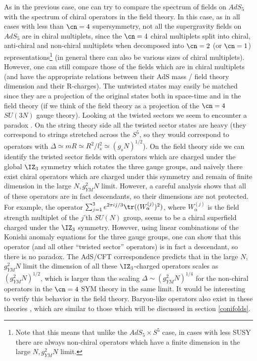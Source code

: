 As in the previous case, one can try to compare the spectrum of fields
on $AdS_5$ with the spectrum of chiral operators in the field
theory. In this case, as in all cases with less than $\cn=4$
supersymmetry, not all the supergravity fields on $AdS_5$ are in
chiral multiplets, since the $\cn=4$ chiral multiplets split into
chiral, anti-chiral and non-chiral multiplets when decomposed into
$\cn=2$ (or $\cn=1$) representations\footnote{Note that this means
that unlike the $AdS_5\times S^5$ case, in cases with less SUSY there
are always non-chiral operators which have a finite dimension in the
large $N, g_{YM}^2 N$ limit.} (in general there can also be various sizes of
chiral multiplets). However, one can still compare those of
the fields which are in chiral multiplets (and have the appropriate
relations between their AdS mass / field theory dimension and their
R-charges). The untwisted states may easily be matched since they are
a projection of the original states both in space-time and in the
field theory (if we think of the field theory as a projection of the
$\cn=4$ $SU(3N)$ gauge theory). Looking at the twisted sectors we seem
to encounter a paradox \cite{Morrison:1998cs}. On the string theory
side all the twisted sector states are heavy (they correspond to
strings stretched across the $S^5$, so they would correspond to
operators with $\Delta
\simeq mR \simeq R^2 / l_s^2 \simeq (g_s N)^{1/2}$). On the field
theory side we can identify the twisted sector fields with operators
which are charged under the global $\IZ_3$ symmetry which rotates the
three gauge groups, and naively there exist chiral operators which are
charged under this symmetry and remain of finite dimension in the
large $N,g_{YM}^2 N$ limit. However, a careful analysis shows that all
of these operators are in fact descendants, so their dimensions are
not protected. For example, the operator $\sum_{j=1}^3 e^{2\pi ij/3}
\tr((W_{\alpha}^{(j)})^2)$, where $W_{\alpha}^{(j)}$ is the field
strength multiplet of the $j$'th $SU(N)$ group, seems to be a chiral
superfield charged under the $\IZ_3$ symmetry. However, using linear
combinations of the Konishi anomaly equations
\cite{Konishi:1984hf,Konishi:1985tu} for the three gauge groups, one
can show that this operator (and all other ``twisted sector''
operators) is in fact a descendant, so there is no paradox. The
AdS/CFT correspondence predicts that in the large $N$, $g_{YM}^2 N$
limit the dimension of all these $\IZ_3$-charged operators scales as
$(g_{YM}^2 N)^{1/2}$, which is larger than the scaling $\Delta \sim
(g_{YM}^2 N)^{1/4}$ for the non-chiral operators in the $\cn=4$ SYM
theory in the same limit. It would be interesting to verify this
behavior in the field theory. Baryon-like operators also exist in
these theories \cite{Gukov:1998kn}, which are similar to those
which will be discussed in section \ref{conifolds}.

